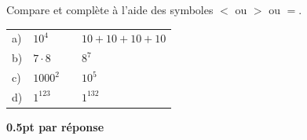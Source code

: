 
\question[2]
Compare et complète à l'aide des symboles $<$ ou $>$ ou $=$.

\vspace{10pt}\def\arraystretch{2}
\begin{tabularx}{0.8\linewidth}{l>{\raggedleft\arraybackslash}p{1cm}cX}
a)&$10^4$&\sol{\bl[20mm]}{>}&$10+10+10+10$\\
b)&$7 \cdot 8$&\sol{\bl[20mm]}{<}&$8^7$\\
c)&$1000^2$&\sol{\bl[20mm]}{>}&$10^5$\\
d)&$1^{123}$&\sol{\bl[20mm]}{=}&$1^{132}$\\
\end{tabularx}
\def\arraystretch{1}

\begin{solution}[0pt]
\textbf{0.5pt par réponse}
\end{solution}
